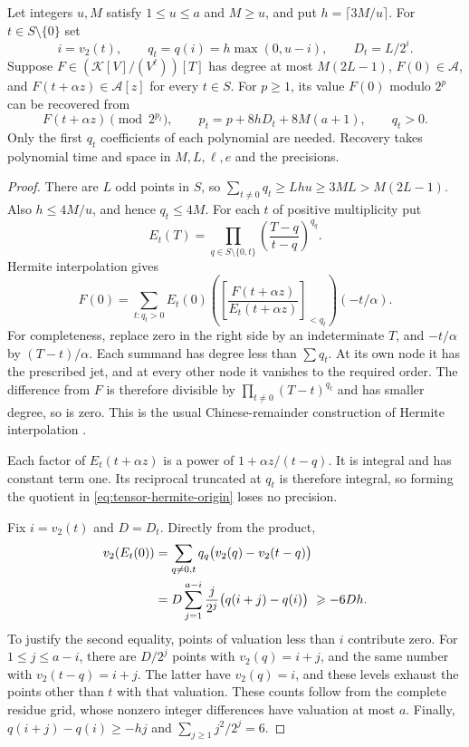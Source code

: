 \begin{lemma}\label{lem:tapered-hermite}
Let integers $u,M$ satisfy $1\le u\le a$ and $M\ge u$, and put
$h=\lceil3M/u\rceil$.
For $t\in S\setminus\{0\}$ set
\[
 i=v_2(t),\qquad q_t=q(i)=h\max(0,u-i),\qquad D_t=L/2^i.
\]
Suppose $F\in(\mathcal K[V]/(V^\ell))[T]$ has degree at most
$M(2L-1)$, $F(0)\in\mathcal A$, and
$F(t+\alpha z)\in\mathcal A[z]$ for every $t\in S$.
For $p\ge1$, its value $F(0)$ modulo $2^p$ can be recovered from
\[
 F(t+\alpha z)\pmod{2^{p_t}},
 \qquad
 p_t=p+8hD_t+8M(a+1),\qquad q_t>0.
\]
Only the first $q_t$ coefficients of each polynomial are needed.
Recovery takes polynomial time and space in $M,L,\ell,e$ and the
precisions.
\end{lemma}
\begin{proof}
There are $L$ odd points in $S$, so
$\sum_{t\ne0}q_t\ge Lhu\ge3ML>M(2L-1)$.  Also
$h\le4M/u$, and hence $q_t\le4M$.
For each $t$ of positive multiplicity put
\[
 E_t(T)=\prod_{q\in S\setminus\{0,t\}}
                    \left(\frac{T-q}{t-q}\right)^{q_q}.
\]
Hermite interpolation gives
\begin{equation}\label{eq:tensor-hermite-origin}
 F(0)=\sum_{t:q_t>0}E_t(0)
       \left(\left[\frac{F(t+\alpha z)}
                            {E_t(t+\alpha z)}\right]_{<q_t}\right)
                            (-t/\alpha).
\end{equation}
For completeness, replace zero in the right side by an indeterminate
$T$, and $-t/\alpha$ by $(T-t)/\alpha$.  Each summand has degree
less than $\sum q_t$.  At its own node it has the prescribed jet,
and at every other node it vanishes to the required order.
The difference from $F$ is therefore divisible by
$\prod_{t\ne0}(T-t)^{q_t}$ and has smaller degree, so is zero.
This is the usual Chinese-remainder construction of Hermite
interpolation \cite[Section~5.6]{vzGG13}.

Each factor of $E_t(t+\alpha z)$ is a power of
$1+\alpha z/(t-q)$.  It is integral and has constant term one.
Its reciprocal truncated at $q_t$ is therefore integral, so
forming the quotient in \eqref{eq:tensor-hermite-origin} loses no
precision.

Fix $i=v_2(t)$ and $D=D_t$.  Directly from the product,
\begin{align}
 v_2(E_t(0))
 &=\sum_{q\ne0,t}q_q\bigl(v_2(q)-v_2(t-q)\bigr)\notag\\
 &=D\sum_{j=1}^{a-i}\frac{j}{2^j}
                           \bigl(q(i+j)-q(i)\bigr)
 \ \ge -6Dh. \label{eq:tensor-hermite-loss}
\end{align}
To justify the second equality, points of valuation less than $i$
contribute zero.  For $1\le j\le a-i$, there are $D/2^j$ points with
$v_2(q)=i+j$, and the same number with $v_2(t-q)=i+j$.
The latter have $v_2(q)=i$, and these levels exhaust the points
other than $t$ with that valuation.  These counts follow from the
complete residue grid, whose nonzero integer differences have
valuation at most $a$.  Finally,
$q(i+j)-q(i)\ge-hj$ and $\sum_{j\ge1}j^2/2^j=6$.


\end{proof}
